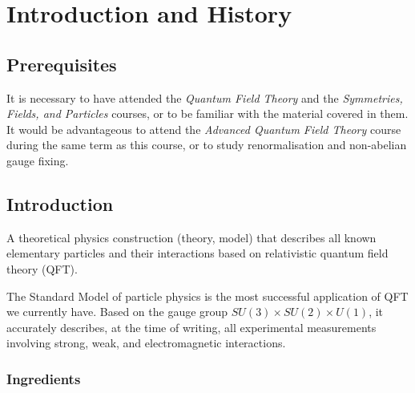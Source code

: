 
\chapter{Introduction and History}%
\label{cha:introduction_and_history}

\section*{Prerequisites}%
\label{sec:prerequisites}

It is necessary to have attended the \emph{Quantum Field Theory} and the \emph{Symmetries, Fields, and Particles} courses, or to be familiar with the material covered in them. It would be advantageous to attend the \emph{Advanced Quantum Field Theory} course during the same term as this course, or to study renormalisation and non-abelian gauge fixing.

\section{Introduction}%
\label{sec:introduction}

\begin{definition}
  A theoretical physics construction (theory, model) that describes all known elementary particles and their interactions based on relativistic quantum field theory (QFT).
\end{definition}

The Standard Model of particle physics is the most successful application of QFT we currently have. Based on the gauge group $SU(3) \times SU(2) \times U(1)$, it accurately describes, at the time of writing, all experimental measurements involving strong, weak, and electromagnetic interactions.

\subsection*{Ingredients}%


